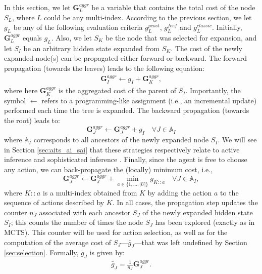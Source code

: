 \documentclass[twoside,11pt]{article}
\begin{document}
In this section, we let $\bm{G}^{aggr}_L$ be a variable that contains the total cost of the node $S_L$, where $L$ could be any multi-index. According to the previous section, we let $g_L$ be any of the following evaluation criteria $g^{pcost}_L$, $g^{feef}_L$ and $g^{classic}_L$. Initially, $\bm{G}^{aggr}_L$ equals $g_L$. Also, we let $S_K$ be the node that was selected for expansion, and let $S_I$ be an arbitrary hidden state expanded from $S_K$. The cost of the newly expanded node(s) can be propagated either forward or backward. The forward propagation (towards the leaves) leads to the following equation:
\begin{align}
\bm{G}^{aggr}_I \leftarrow g_I + \bm{G}^{aggr}_K,
\end{align}
where here $\bm{G}^{aggr}_K$ is the aggregated cost of the parent of $S_I$. Importantly, the symbol $\leftarrow$ refers to a programming-like assignment (i.e., an incremental update) performed each time the tree is expanded. The backward propagation (towards the root) leads to:
\begin{equation}\label{eq:backprop}
\bm{G}^{aggr}_J \leftarrow \bm{G}^{aggr}_J + g_I \quad \forall J \in \mathbb{A}_I
\end{equation}
where $\mathbb{A}_I$ corresponds to all ancestors of the newly expanded node $S_I$. We will see in Section \ref{sec:aits_ai_sai} that these strategies respectively relate to active inference and sophisticated inference \citep{Sophisticated_INF}. Finally, since the agent is free to choose any action, we can back-propagate the (locally) minimum cost, i.e.,
\begin{equation}\label{eq:minbackprop}
\bm{G}^{aggr}_J \leftarrow \bm{G}^{aggr}_J + \min_{a \in \{1, ..., |U|\}} g_{K::a} \quad \forall J \in \mathbb{A}_I,
\end{equation}
where $K::a$ is a multi-index obtained from $K$ by adding the action $a$ to the sequence of actions described by $K$. In all cases, the propagation step updates the counter $n_J$ associated with each ancestor $S_J$ of the newly expanded hidden state $S_I$; this counts the number of times the node $S_J$ has been explored (exactly as in MCTS). This counter will be used for action selection, as well as for the computation of the average cost of $S_J$---$\bar{g}_J$---that was left undefined by Section \ref{sec:selection}. Formally, $\bar{g}_J$ is given by:
\begin{align}
\bar{g}_J = \frac{1}{n_J}\bm{G}^{aggr}_J.
\end{align}
\end{document}
